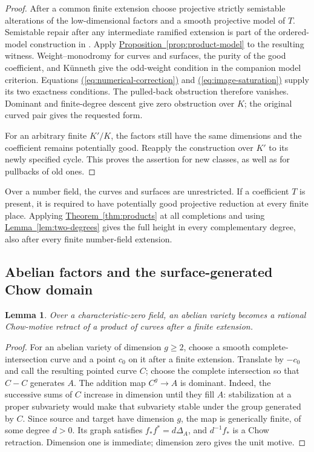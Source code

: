 \documentclass[11pt,a4paper]{article}
\newtheorem{lemma}[theorem]{Lemma}
\theoremstyle{definition}
\theoremstyle{remark}\newtheorem{remark}[theorem]{Remark}
\numberwithin{equation}{section}
\newcommand{\thmref}[1]{\hyperref[#1]{\textcolor{resultlink}{Theorem~\ref*{#1}}}}
\newcommand{\propref}[1]{\hyperref[#1]{\textcolor{resultlink}{Proposition~\ref*{#1}}}}
\newcommand{\lemref}[1]{\hyperref[#1]{\textcolor{resultlink}{Lemma~\ref*{#1}}}}
\renewcommand{\eqref}[1]{\hyperref[#1]{\textcolor{equationlink}{(\ref*{#1})}}}
\begin{document}
\begin{proof}
After a common finite extension choose projective strictly semistable
alterations of the low-dimensional factors and a smooth projective
model of $T$. Semistable repair after any intermediate ramified
extension is part of the ordered-model construction in
\cite{InternalProducts}. Apply \propref{prop:product-model} to the
resulting witness. Weight--monodromy for curves and surfaces, the
purity of the good coefficient, and K\"unneth give the odd-weight
condition in the companion model criterion. Equations
\eqref{eq:numerical-correction} and \eqref{eq:image-saturation}
supply its two exactness conditions. The pulled-back obstruction
therefore vanishes. Dominant and finite-degree descent give zero
obstruction over $K$; the original curved pair gives the requested
form.

For an arbitrary finite $K'/K$, the factors still have the same
dimensions and the coefficient remains potentially good. Reapply
the construction over $K'$ to its newly specified cycle. This proves
the assertion for new classes, as well as for pullbacks of old ones.
\end{proof}

Over a number field, the curves and surfaces are unrestricted. If a
coefficient $T$ is present, it is required to have potentially good
projective reduction at every finite place. Applying
\thmref{thm:products} at all completions and using
\lemref{lem:two-degrees} gives the full height in every complementary
degree, also after every finite number-field extension.

\subsection{Abelian factors and the surface-generated Chow domain}

\begin{lemma}\label{lem:abelian-curve-source}
Over a characteristic-zero field, an abelian variety becomes a
rational Chow-motive retract of a product of curves after a finite
extension.
\end{lemma}

\begin{proof}
For an abelian variety of dimension $g\geq2$, choose a smooth
complete-intersection curve and a point $c_0$ on it after a finite
extension. Translate by $-c_0$ and call the resulting pointed curve
$C$; choose the complete intersection so that $C-C$ generates $A$.
The addition map $C^g\to A$ is dominant. Indeed,
the successive sums of $C$ increase in dimension until they fill
$A$: stabilization at a proper subvariety would make that subvariety
stable under the group generated by $C$. Since source and target
have dimension $g$, the map is generically finite, of some degree
$d>0$. Its graph satisfies $f_*f^*=d\Delta_A$, and
$d^{-1}f_*$ is a Chow retraction. Dimension one is immediate;
dimension zero gives the unit motive.
\end{proof}
\end{document}
